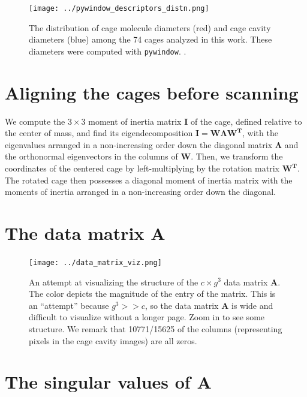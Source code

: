 \documentclass[journal=jacsat,manuscript=article]{achemso}
\begin{document}
\begin{figure}
\centering
	\texttt{[image: ../pywindow\_descriptors\_distn.png]}
	\caption{The distribution of cage molecule diameters (red) and cage cavity diameters (blue) among the 74 cages analyzed in this work. These diameters were computed with \texttt{pywindow}. \cite{miklitz2018pywindow}.
	} \label{fig:pywindow_descriptors_distn}
\end{figure}

\newpage
\clearpage

\section{Aligning the cages before scanning} 
\label{sec:alignment_details}
We compute the $3\times 3$ moment of inertia matrix $\mathbf{I}$ of the cage, defined relative to the center of mass, and find its eigendecomposition $\mathbf{I}=\mathbf{W}\mathbf{\Lambda}\mathbf{W^T}$, with the eigenvalues arranged in a non-increasing order down the diagonal matrix $\mathbf{\Lambda}$ and the orthonormal eigenvectors in the columns of $\mathbf{W}$. Then, we transform the coordinates of the centered cage by left-multiplying by the rotation matrix $\mathbf{W^T}$. The rotated cage then possesses a diagonal moment of inertia matrix with the moments of inertia arranged in a non-increasing order down the diagonal.

\section{The data matrix $\mathbf{A}$}

\begin{figure}
\centering
	\texttt{[image: ../data\_matrix\_viz.png]}
	\caption{An attempt at visualizing the structure of the $c \times g^3$ data matrix $\mathbf{A}$. The color depicts the magnitude of the entry of the matrix. This is an ``attempt'' because $g^3>>c$, so the data matrix $\mathbf{A}$ is wide and difficult to visualize without a longer page. Zoom in to see some structure. We remark that 10771/15625 of the columns (representing pixels in the cage cavity images) are all zeros.
	} \label{fig:data_matrix}
\end{figure}

\newpage
\clearpage

\section{The singular values of $\mathbf{A}$}
\end{document}
